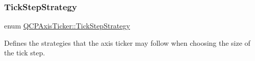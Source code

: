 \mbox{\label{class_q_c_p_axis_ticker_ab6d2f9d9477821623ac9bc4b21ddf49a}} 
\subsubsection{\texorpdfstring{Tick\+Step\+Strategy}{TickStepStrategy}\hspace{0.1cm}{\footnotesize\ttfamily [2/2]}}
{\footnotesize\ttfamily enum \hyperlink{class_q_c_p_axis_ticker_ab6d2f9d9477821623ac9bc4b21ddf49a}{Q\+C\+P\+Axis\+Ticker\+::\+Tick\+Step\+Strategy}}

Defines the strategies that the axis ticker may follow when choosing the size of the tick step.

